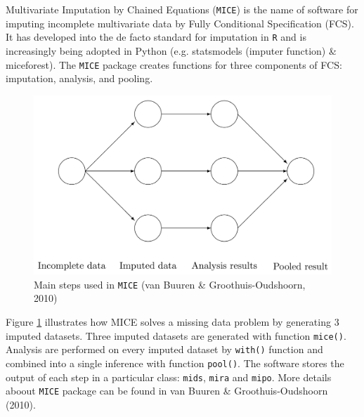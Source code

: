 \documentclass[12pt, fullpage, a4paper]{article}
\begin{document}
Multivariate Imputation by Chained Equations (\texttt{MICE}) is the name of software for imputing incomplete multivariate data by Fully Conditional Specification (FCS). It has developed into the de facto standard for imputation in \texttt{R} and is increasingly being adopted in Python (e.g. statsmodels (imputer function) \& miceforest). The \texttt{MICE} package creates functions for three components of FCS: imputation, analysis, and pooling. 
\begin{figure}[ht!]
	\centering
	\includegraphics[scale=.2]{plot/miflow}
	\caption{Main steps used in \texttt{MICE} (van Buuren \& Groothuis-Oudshoorn, 2010)}
	\label{fig1}
\end{figure} 
Figure \ref{fig1} illustrates how MICE solves a missing data problem by generating 3 imputed datasets. Three imputed datasets are generated with function \texttt{mice()}. Analysis are performed on every imputed dataset by \texttt{with()} function and combined into a single inference with function \texttt{pool()}. The software stores the output of each step in a particular class: \texttt{mids}, \texttt{mira} and \texttt{mipo}. More details aboout \texttt{MICE} package can be found in van Buuren \& Groothuis-Oudshoorn (2010).\nocite{buuren2010mice}
\end{document}
